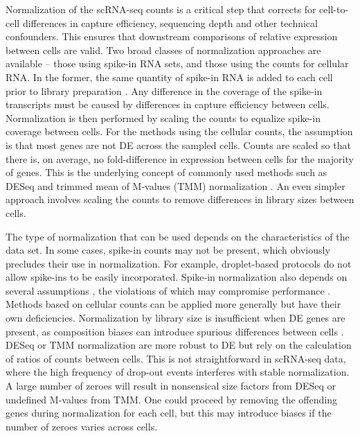 \documentclass{bmcart}
\begin{document}
Normalization of the scRNA-seq counts is a critical step that corrects for cell-to-cell differences in capture efficiency, sequencing depth and other technical confounders.
This ensures that downstream comparisons of relative expression between cells are valid.
Two broad classes of normalization approaches are available -- those using spike-in RNA sets, and those using the counts for cellular RNA.
In the former, the same quantity of spike-in RNA is added to each cell prior to library preparation \cite{stegle2015computational}.
Any difference in the coverage of the spike-in transcripts must be caused by differences in capture efficiency between cells.
Normalization is then performed by scaling the counts to equalize spike-in coverage between cells.
For the methods using the cellular counts, the assumption is that most genes are not DE across the sampled cells.
Counts are scaled so that there is, on average, no fold-difference in expression between cells for the majority of genes.
This is the underlying concept of commonly used methods such as DESeq \cite{anders2010differential} and trimmed mean of M-values (TMM) normalization \cite{robinson2010scaling}.
An even simpler approach involves scaling the counts to remove differences in library sizes between cells.

The type of normalization that can be used depends on the characteristics of the data set.
In some cases, spike-in counts may not be present, which obviously precludes their use in normalization.
For example, droplet-based protocols \cite{klein2015droplet,macosko2015highly} do not allow spike-ins to be easily incorporated.
Spike-in normalization also depends on several assumptions \cite{robinson2010scaling,marinov2014singlecell,grun2015design}, 
    the violations of which may compromise performance \cite{risso2014normalization}.
Methods based on cellular counts can be applied more generally but have their own deficiencies.
Normalization by library size is insufficient when DE genes are present, as composition biases can introduce spurious differences between cells \cite{robinson2010scaling}.
DESeq or TMM normalization are more robust to DE but rely on the calculation of ratios of counts between cells.
This is not straightforward in scRNA-seq data, where the high frequency of drop-out events interferes with stable normalization.
A large number of zeroes will result in nonsensical size factors from DESeq or undefined M-values from TMM.
One could proceed by removing the offending genes during normalization for each cell, but this may introduce biases if the number of zeroes varies across cells.
\end{document}
